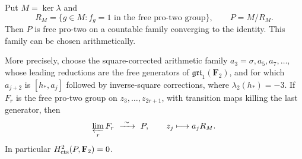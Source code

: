 \begin{theorem}
\label{thm:normalized-protwo-free}
Put \(M=\ker\lambda\) and
\[
 R_M=\{g\in M:f_g=1\text{ in the free pro-two group}\},
 \qquad P=M/R_M.
\]
Then \(P\) is free pro-two on a countable family converging to
the identity. This family can be chosen arithmetically.

More precisely, choose the square-corrected arithmetic family
\(a_3=\sigma,a_5,a_7,\ldots\), whose leading reductions are the
free generators of
\(\mathfrak{grt}_1(\mathbf F_2)\), and for which
\(a_{j+2}\) is \([h_*,a_j]\) followed by inverse-square corrections,
where \(\lambda_2(h_*)=-3\).
If \(F_r\) is the free pro-two group on
\(z_3,\ldots,z_{2r+1}\), with transition maps killing the last
generator, then
\begin{equation}
 \varprojlim_r F_r \ \xrightarrow{\ \sim\ }\ P,
 \qquad z_j\longmapsto a_jR_M.                          \label{eq:normalized-protwo-1}
\end{equation}
In particular \(H^2_{\rm cts}(P,\mathbf F_2)=0\).
\end{theorem}

